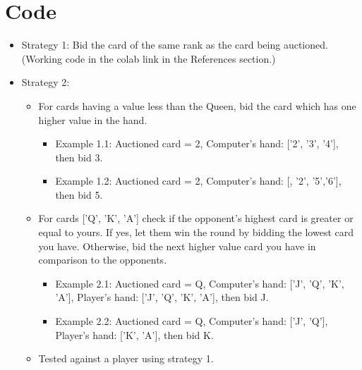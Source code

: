 \documentclass[10pt,onecolumn,letterpaper]{article}
\begin{document}
\section{Code}
\begin{itemize}
  \item Strategy 1: Bid the card of the same rank as the card being auctioned. (Working code in the colab link in the References section.)
  \item Strategy 2: 
     \begin{itemize}
     \item For cards having a value less than the Queen, bid the card which has one higher value in the hand.
        \begin{itemize}
	\item Example 1.1: Auctioned card = 2, Computer's hand: ['2', '3', '4'], then bid 3.
	\item Example 1.2: Auctioned card = 2, Computer's hand: [, '2', '5','6'], then bid 5.
         \end{itemize}
     \item For cards ['Q', 'K', 'A'] check if the opponent's highest card is greater or equal to yours. If yes, let them win the round by bidding the lowest card you have. Otherwise, bid the next higher value card you have in comparison to the opponents.
       \begin{itemize}
       \item Example 2.1: Auctioned card = Q, Computer's hand: ['J', 'Q', 'K', 'A'], Player's hand: ['J', 'Q', 'K', 'A'], then bid J.
       \item Example 2.2: Auctioned card = Q, Computer's hand: ['J', 'Q'], Player's hand: ['K', 'A'], then bid K.
       \end{itemize}
    \item Tested against a player using strategy 1.
    \end{itemize}
\end{itemize}
    
\end{document}
